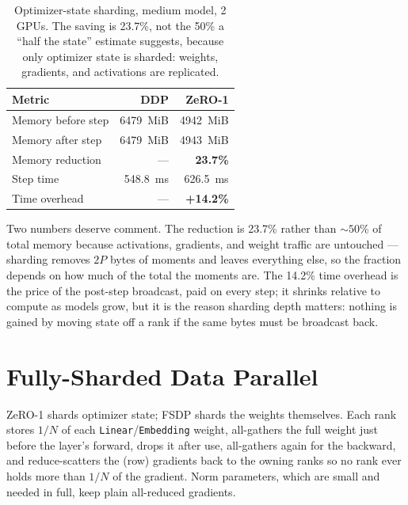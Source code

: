 \documentclass{article}
\begin{document}
\begin{table}[t]
  \caption{Optimizer-state sharding, medium model, 2 GPUs. The saving is 23.7\%, not the 50\% a ``half the state'' estimate suggests, because only optimizer state is sharded: weights, gradients, and activations are replicated.}
  \label{tab:zero}
  \centering
  \small
  \begin{tabular}{@{}lrr@{}}
    \toprule
    Metric & DDP & ZeRO-1 \\
    \midrule
    Memory before step & 6479~MiB & 4942~MiB \\
    Memory after step  & 6479~MiB & 4943~MiB \\
    Memory reduction   & ---       & \textbf{23.7\%} \\
    Step time          & 548.8~ms  & 626.5~ms \\
    Time overhead      & ---       & \textbf{+14.2\%} \\
    \bottomrule
  \end{tabular}
\end{table}

Two numbers deserve comment. The reduction is 23.7\% rather than ${\sim}50$\% of total memory because activations, gradients, and weight traffic are untouched --- sharding removes $2P$ bytes of moments and leaves everything else, so the fraction depends on how much of the total the moments are. The 14.2\% time overhead is the price of the post-step broadcast, paid on every step; it shrinks relative to compute as models grow, but it is the reason sharding depth matters: nothing is gained by moving state off a rank if the same bytes must be broadcast back.

\section{Fully-Sharded Data Parallel}
\label{sec:fsdp}

ZeRO-1 shards optimizer state; FSDP \cite{fsdp} shards the weights themselves. Each rank stores $1/N$ of each \texttt{Linear}/\texttt{Embedding} weight, all-gathers the full weight just before the layer's forward, drops it after use, all-gathers again for the backward, and reduce-scatters the (row) gradients back to the owning ranks so no rank ever holds more than $1/N$ of the gradient. Norm parameters, which are small and needed in full, keep plain all-reduced gradients.
\end{document}
